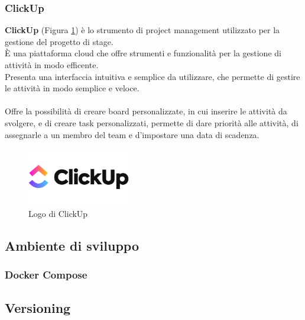 \subsubsection{ClickUp}   %
\textbf{ClickUp} (Figura \ref{fig:clickup}) è lo strumento di project management utilizzato per la gestione del progetto di stage.\\ 
È una piattaforma cloud che offre strumenti e funzionalità per la gestione di attività in modo efficente.\\
Presenta una interfaccia intuitiva e semplice da utilizzare, che permette di gestire le attività in modo semplice e veloce.\\
\pagebreak
\\
Offre la possibilità di creare \gls{board}{} personalizzate, in cui inserire le attività da svolgere, e di creare \gls{task}{} personalizzati,
permette di dare priorità alle attività, di assegnarle a un membro del team e d'impostare una data di scadenza.\\

\begin{figure}[h]
    \centering
    \includegraphics[width=0.4\textwidth]{images/tecnologie/logo_clickup.png}
    \caption{Logo di ClickUp}
    \label{fig:clickup}
\end{figure}
\subsection{Ambiente di sviluppo}

\subsubsection{Docker Compose}

\pagebreak
\subsection{Versioning}
